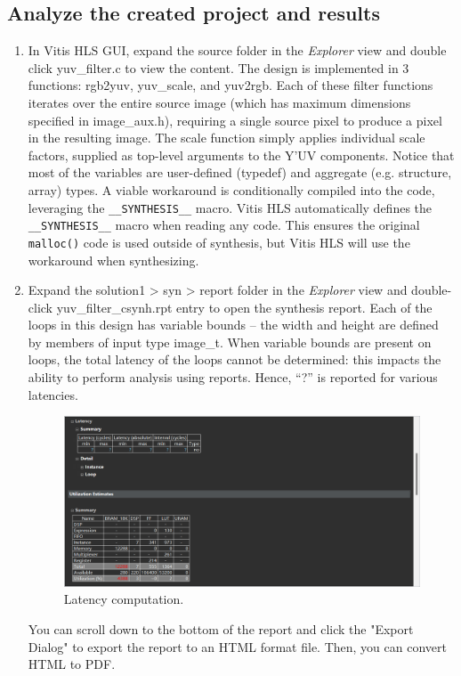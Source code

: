 \documentclass[a4paper,12pt,twoside]{article}
\begin{document}
\subsection{Analyze the created project and results}
\begin{enumerate}
    \item In Vitis HLS GUI, expand the source folder in the \textit{Explorer} view and double click yuv\_filter.c to view the content. The design is implemented in 3 functions: rgb2yuv, yuv\_scale, and yuv2rgb. Each of these filter functions iterates over the entire source image (which has maximum dimensions specified in image\_aux.h), requiring a single source pixel to produce a pixel in the resulting image. The scale function simply applies individual scale factors, supplied as top-level arguments to the Y’UV components. Notice that most of the variables are user-defined (typedef) and aggregate (e.g. structure, array) types. A viable workaround is conditionally compiled into the code, leveraging the \texttt{\_\_SYNTHESIS\_\_} macro. Vitis HLS automatically defines the \texttt{\_\_SYNTHESIS\_\_} macro when reading any code. This ensures the original \texttt{malloc()} code is used outside of synthesis, but Vitis HLS will use the workaround when synthesizing.
    \item Expand the solution1 > syn > report folder in the \textit{Explorer} view and double-click yuv\_filter\_csynh.rpt entry to open the synthesis report. Each of the loops in this design has variable bounds – the width and height are defined by members of input type image\_t. When variable bounds are present on loops, the total latency of the loops cannot be determined: this impacts the ability to perform analysis using reports. Hence, “?” is reported for various latencies.
    \begin{figure}[H]
        \centering
        \includegraphics[width=\textwidth]{images/1.png}
        \caption{Latency computation.}
    \end{figure}
    You can scroll down to the bottom of the report and click the "Export Dialog" to export the report to an HTML format file. Then, you can convert HTML to PDF.
\end{enumerate}
\end{document}
